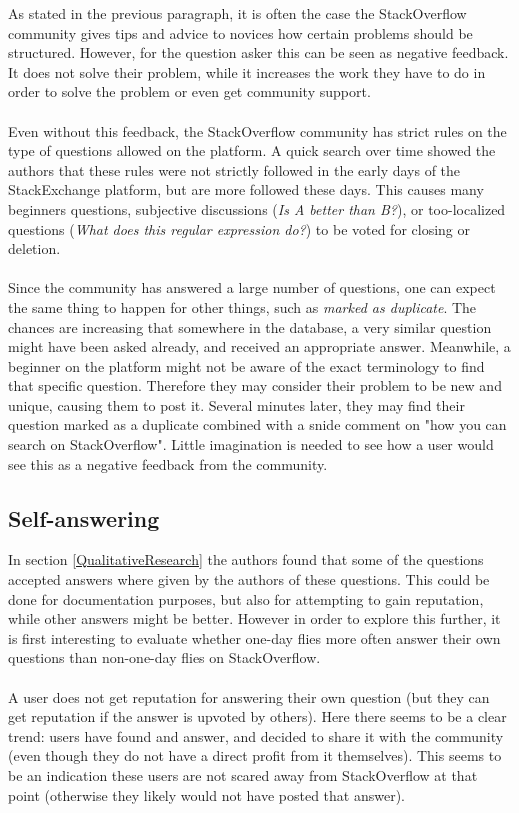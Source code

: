 \documentclass[conference]{IEEEtran}
\begin{document}
As stated in the previous paragraph, it is often the case the StackOverflow community gives tips and advice to novices how certain problems should be structured. However, for the question asker this can be seen as negative feedback. It does not solve their problem, while it increases the work they have to do in order to solve the problem or even get community support.
\\
\\
Even without this feedback, the StackOverflow community has strict rules on the type of questions allowed on the platform. A quick search over time showed the authors that these rules were not strictly followed in the early days of the StackExchange platform, but are more followed these days. This causes many beginners questions, subjective discussions (\textit{Is A better than B?}), or too-localized questions (\textit{What does this regular expression do?}) to be voted for closing or deletion.
\\
\\
Since the community has answered a large number of questions, one can expect the same thing to happen for other things, such as \textit{marked as duplicate}. The chances are increasing that somewhere in the database, a very similar question might have been asked already, and received an appropriate answer. Meanwhile, a beginner on the platform might not be aware of the exact terminology to find that specific question. Therefore they may consider their problem to be new and unique, causing them to post it. Several minutes later, they may find their question marked as a duplicate combined with a snide comment on "how you can search on StackOverflow". Little imagination is needed to see how a user would see this as a negative feedback from the community.


\subsection{Self-answering}
In section \ref{QualitativeResearch}  the authors found that some of the questions accepted answers where given by the authors of these questions. This could be done for documentation purposes, but also for attempting to gain reputation, while other answers might be better. However in order to explore this further, it is first interesting to evaluate whether one-day flies more often answer their own questions than non-one-day flies on StackOverflow.
\\
\\
A user does not get reputation for answering their own question (but they can get reputation if the answer is upvoted by others). Here there seems to be a clear trend: users have found and answer, and decided to share it with the community (even though they do not have a direct profit from it themselves). This seems to be an indication these users are not scared away from StackOverflow at that point (otherwise they likely would not have posted that answer). 
\end{document}
